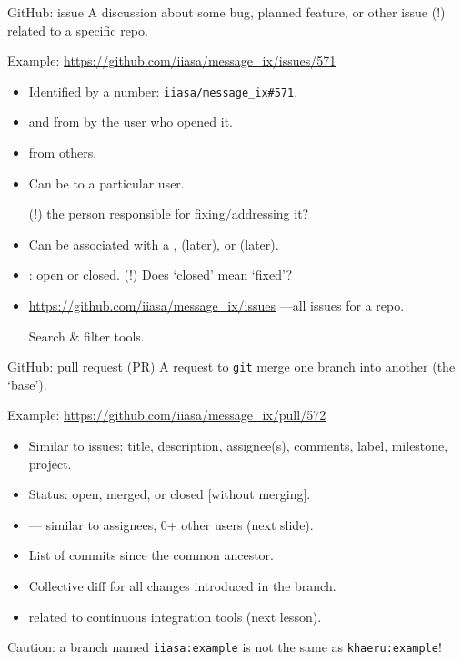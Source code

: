 \documentclass[12pt,aspectratio=169]{beamer}
\begin{document}
\begin{frame}{GitHub: issue}
  A discussion about some bug, planned feature, or other issue \alert{(!)} related to a specific repo.

  \bigskip
  Example: \url{https://github.com/iiasa/message_ix/issues/571}

  \bigskip
  \begin{itemize}
    \item Identified by a number: \texttt{iiasa/message\_ix\#571}.
    \item {} and  from by the user who opened it.
    \item {} from others.
    \item Can be  to a particular user.

          \alert{(!)} the person responsible for fixing/addressing it?
    \item Can be associated with a ,  (later), or  (later).
    \item {}: open or closed.
          \alert{(!)} Does ‘closed’ mean ‘fixed’?
    \item \url{https://github.com/iiasa/message_ix/issues} —all issues for a repo.

          \hspace{2em} Search \& filter tools.
  \end{itemize}

\end{frame}

\begin{frame}{GitHub: pull request (PR)}
  A request to \texttt{git} merge one branch into another (the ‘base’).

  \bigskip
  Example: \url{https://github.com/iiasa/message_ix/pull/572}

  \bigskip
  \begin{itemize}
    \item Similar to issues: title, description, assignee(s), comments, label, milestone, project.
    \item Status: open, merged, or closed [without merging].
    \item {} — similar to assignees, 0+ other users (next slide).
    \item List of commits since the common ancestor.
    \item Collective diff for all changes introduced in the branch.
    \item {} related to continuous integration tools (next lesson).
  \end{itemize}

  \alert{Caution:} a branch named \texttt{iiasa:example} is not the same as
  \texttt{khaeru:example}!

\end{frame}
\end{document}
